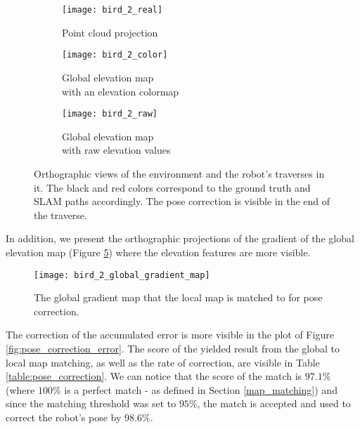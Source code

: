 \begin{figure}[h!]
    \centering
    \begin{subfigure}{0.5\textwidth}
        \centering
        \texttt{[image: bird\_2\_real]}
        \caption{Point cloud projection}
        \label{fig:bird_2_real}
    \end{subfigure}
    \begin{subfigure}{0.5\textwidth}
        \centering
        \texttt{[image: bird\_2\_color]}
        \caption{Global elevation map\\with an elevation colormap}
        \label{fig:bird_2_color}
    \end{subfigure}%
    \begin{subfigure}{0.5\textwidth}
        \centering
        \texttt{[image: bird\_2\_raw]}
        \caption{Global elevation map\\with raw elevation values}
        \label{fig:bird_2_raw}
    \end{subfigure}
    \caption[Traverse of second experiment]{Orthographic views of the
        environment and the robot's traverses in it. The black and red colors
        correspond to the ground truth and SLAM paths accordingly. The pose
        correction is visible in the end of the traverse.}
    \label{fig:bird_2}
\end{figure}

In addition, we present the orthographic projections of the gradient of the
global elevation map (Figure \ref{fig:bird_2_global_gradient_map}) where
the elevation features are more visible.

\begin{figure}[h!]
    \centering
    \texttt{[image: bird\_2\_global\_gradient\_map]}
    \caption[Global gradient map for pose correction]{
        The global gradient map that the local map is matched to for
        pose correction.
    }
    \label{fig:bird_2_global_gradient_map}
\end{figure}

The correction of the accumulated error is more visible in the plot of
Figure \ref{fig:pose_correction_error}.
The score of the yielded result from the global to local map matching,
as well as the rate of correction, are visible in Table
\ref{table:pose_correction}.
We can notice that the score of the match is $97.1\%$ (where $100\%$ is a
perfect match - as defined in Section \ref{map_matching}) and since
the matching threshold was set to $95\%$, the match is accepted and used
to correct the robot's pose by $98.6\%$.

